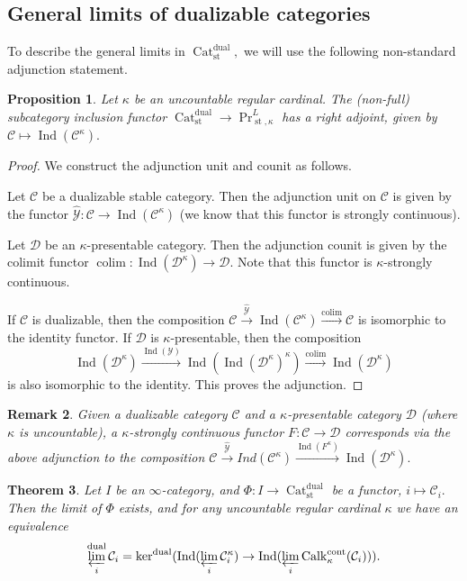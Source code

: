 \documentclass[11pt,leqno]{amsart}
\newtheorem{theo}{Theorem}[section]
\newtheorem{prop}[theo]{Proposition}
\newtheorem{remark}[theo]{Remark}
\numberwithin{equation}{section}
\DeclareMathOperator*{\colim}{colim}
\newcommand{\prolim}[1][]{\mathop{\varprojlim}\limits_{#1}}
\newcommand{\xto}{\xrightarrow}
\newcommand{\Cat}{\operatorname{Cat}}
\newcommand{\cont}{\operatorname{cont}}
\newcommand{\st}{\operatorname{st}}
\newcommand{\dual}{\operatorname{dual}}
\newcommand{\cD}{{\mathcal D}}
\newcommand{\cC}{{\mathcal C}}
\newcommand{\cY}{{\mathcal Y}}
\newcommand{\Ind}{\operatorname{Ind}}
\newcommand{\Calk}{\operatorname{Calk}}
\begin{document}
\subsection{General limits of dualizable categories}
\label{ssec:general_limits_Cat^dual}

To describe the general limits in $\Cat_{\st}^{\dual},$ we will use the following non-standard adjunction statement.

\begin{prop}\label{prop:nonstandard_adjunction} Let $\kappa$ be an uncountable regular cardinal. The (non-full) subcategory inclusion functor $\Cat_{\st}^{\dual}\to \Pr^L_{\st,\kappa}$ has a right adjoint, given by $\cC\mapsto \Ind(\cC^{\kappa}).$\end{prop}

\begin{proof}We construct the adjunction unit and counit as follows. 

Let $\cC$ be a dualizable stable category. Then the adjunction unit on $\cC$ is given by the functor $\hat{\cY}:\cC\to \Ind(\cC^{\kappa})$ (we know that this functor is strongly continuous).

Let $\cD$ be an $\kappa$-presentable category. Then the adjunction counit is given by the colimit functor $\colim:\Ind(\cD^{\kappa})\to \cD.$ Note that this functor is $\kappa$-strongly continuous.

If $\cC$ is dualizable, then the composition $\cC\xto{\hat{\cY}} \Ind(\cC^{\kappa})\xto{\colim} \cC$ is isomorphic to the identity functor. If $\cD$ is $\kappa$-presentable, then the composition $$\Ind(\cD^{\kappa})\xto{\Ind(\cY)} \Ind(\Ind(\cD^{\kappa})^{\kappa})\xto{\colim} \Ind(\cD^{\kappa})$$ is also isomorphic to the identity. This proves the adjunction.
\end{proof}

\begin{remark}Given a dualizable category $\cC$ and a $\kappa$-presentable category $\cD$ (where $\kappa$ is uncountable), a $\kappa$-strongly continuous functor $F:\cC\to\cD$ corresponds via the above adjunction to the composition $\cC\xto{\hat{\cY}}Ind(\cC^{\kappa})\xto{\Ind(F^{\kappa})} \Ind(\cD^{\kappa}).$\end{remark}

\begin{theo}\label{th:limit_of_dualizable} Let $I$ be an $\infty$-category, and $\Phi:I\to\Cat_{\st}^{\dual}$ be a functor, $i\mapsto \cC_i.$ Then the limit of $\Phi$ exists, and for any uncountable regular cardinal $\kappa$ we have an equivalence
$$\prolim[i]^{\dual}\cC_i=\ker^{\dual}(\Ind(\prolim[i]\cC_i^{\kappa})\to \Ind(\prolim[i] \Calk_{\kappa}^{\cont}(\cC_i))).$$\end{theo}
\end{document}
